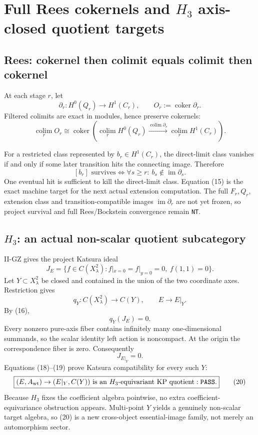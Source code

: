 \documentclass[10pt,a4paper]{article}
\newcommand{\PASS}{\texttt{PASS}}
\newcommand{\NT}{\texttt{NT}}
\newcommand{\im}{\operatorname{im}}
\begin{document}
\section{\texorpdfstring{Full Rees cokernels and $H_3$ axis-closed quotient targets}{Full Rees cokernels and H3 axis-closed quotient targets}}
\subsection*{Rees: cokernel then colimit equals colimit then cokernel}
At each stage $r$, let
\[
\partial_r:H^0(Q_r)\to H^1(C_r),
\qquad
O_r:=\operatorname{coker}\partial_r.
\tag{13}
\]
Filtered colimits are exact in modules, hence preserve cokernels:
\[
\boxed{
\operatorname*{colim}_r O_r
\cong
\operatorname{coker}\!\left(
\operatorname*{colim}_r H^0(Q_r)
\xrightarrow{\operatorname*{colim}\partial_r}
\operatorname*{colim}_r H^1(C_r)
\right).
}
\tag{14}
\]

For a restricted class represented by $b_r\in H^1(C_r)$, the direct-limit class vanishes if and only if some later transition hits the connecting image.  Therefore
\[
\boxed{
[b_r]\text{ survives}
\iff
\forall s\ge r:\ b_s\notin\im\partial_s.
}
\tag{15}
\]
One eventual hit is sufficient to kill the direct-limit class.  Equation (15) is the exact machine target for the next actual extension computation.  The full $F_r,Q_r$, extension class and transition-compatible images $\im\partial_r$ are not yet frozen, so project survival and full Rees/Bockstein convergence remain \NT.

\subsection*{$H_3$: an actual non-scalar quotient subcategory}
II-GZ gives the project Katsura ideal
\[
J_E=\{f\in C(X_\lambda^2):f|_{x=0}=f|_{y=0}=0,\ f(1,1)=0\}.
\tag{16}
\]
Let $Y\subset X_\lambda^2$ be closed and contained in the union of the two coordinate axes.  Restriction gives
\[
q_Y:C(X_\lambda^2)\longrightarrow C(Y),
\qquad
E\longrightarrow E|_Y.
\tag{17}
\]
By (16),
\[
\boxed{q_Y(J_E)=0.}
\tag{18}
\]
Every nonzero pure-axis fiber contains infinitely many one-dimensional summands, so the scalar identity left action is noncompact.  At the origin the correspondence fiber is zero.  Consequently
\[
\boxed{J_{E|_Y}=0.}
\tag{19}
\]
Equations (18)--(19) prove Katsura compatibility for every such $Y$:
\[
\boxed{
(E,A_{\rm wt})\to(E|_Y,C(Y))
\text{ is an }H_3\text{-equivariant KP quotient}:\PASS.
}
\tag{20}
\]
Because $H_3$ fixes the coefficient algebra pointwise, no extra coefficient-equivariance obstruction appears.  Multi-point $Y$ yields a genuinely non-scalar target algebra, so (20) is a new cross-object essential-image family, not merely an automorphism sector.
\end{document}
